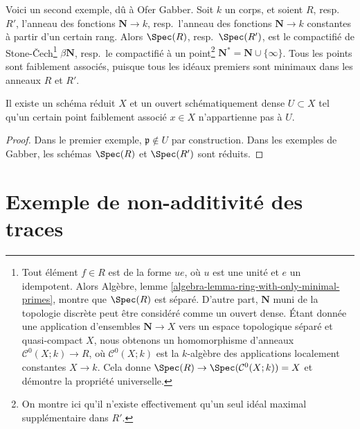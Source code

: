 \medskip\noindent
Voici un second exemple, dû à Ofer Gabber. Soit $k$ un corps, et soient
$R$, resp.\ $R'$, l'anneau des fonctions $\mathbf{N} \to k$, resp.\ l'anneau
des fonctions $\mathbf{N} \to k$ constantes à partir d'un certain rang. Alors $\Spec(R)$,
resp.\ $\Spec(R')$, est le compactifié de
Stone-{\v C}ech\footnote{Tout élément $f \in R$ est de la
forme $ue$, où $u$ est une unité et $e$ un idempotent. Alors
Algèbre, lemme \ref{algebra-lemma-ring-with-only-minimal-primes},
montre que $\Spec(R)$ est séparé. D'autre part, $\mathbf{N}$ muni de la
topologie discrète peut être considéré comme un ouvert dense. Étant donnée une application d'ensembles
$\mathbf{N} \to X$ vers un espace topologique séparé et quasi-compact $X$,
nous obtenons un homomorphisme d'anneaux $\mathcal{C}^0(X; k) \to R$, où $\mathcal{C}^0(X; k)$
est la $k$-algèbre des applications localement constantes $X \to k$. Cela donne
$\Spec(R) \to \Spec(\mathcal{C}^0(X; k)) = X$ et démontre la propriété
universelle.} $\beta\mathbf{N}$, resp.\ le compactifié à
un point\footnote{On montre ici qu'il n'existe effectivement
qu'un seul idéal maximal supplémentaire dans $R'$.}
$\mathbf{N}^* = \mathbf{N} \cup \{\infty\}$.
Tous les points sont faiblement associés, puisque tous les idéaux premiers sont minimaux dans les
anneaux $R$ et $R'$.

\begin{lemma}
\label{lemma-example-schematically-dense-missing-weakly-associated-point}
Il existe un schéma réduit $X$ et un ouvert schématiquement dense
$U \subset X$ tel qu'un certain point faiblement associé $x \in X$ n'appartienne pas à $U$.
\end{lemma}

\begin{proof}
Dans le premier exemple, $\mathfrak p \not \in U$ par construction.
Dans les exemples de Gabber, les schémas $\Spec(R)$ et $\Spec(R')$ sont réduits.
\end{proof}



\section{Exemple de non-additivité des traces}
\label{section-non-additive}

